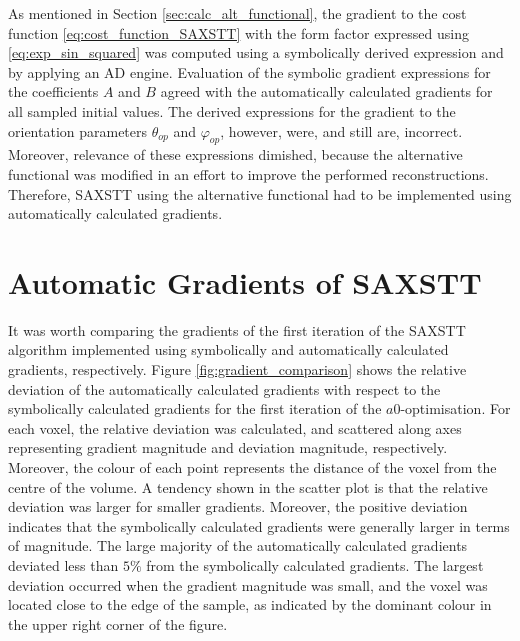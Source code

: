 
As mentioned in Section \ref{sec:calc_alt_functional},
the gradient to the cost function \eqref{eq:cost_function_SAXSTT} with the form factor expressed using \eqref{eq:exp_sin_squared} was computed using a symbolically derived expression and by applying an AD engine.
Evaluation of the symbolic gradient expressions for the coefficients $A$ and $B$ agreed with the automatically calculated gradients for all sampled initial values.
The derived expressions for the gradient to the orientation parameters $\theta_{op}$ and $\varphi_{op}$, however, were, and still are, incorrect.
Moreover, relevance of these expressions dimished, because the alternative functional was modified in an effort to improve the performed reconstructions.
Therefore, SAXSTT using the alternative functional had to be implemented using automatically calculated gradients.

\section{Automatic Gradients of SAXSTT}

It was worth comparing the gradients of the first iteration of the SAXSTT algorithm implemented using symbolically and automatically calculated gradients, respectively.
Figure \ref{fig:gradient_comparison} shows
the relative deviation of the automatically calculated gradients with respect to the symbolically calculated gradients for the first iteration of the $a0$-optimisation.
For each voxel, the relative deviation was calculated, and scattered along axes representing gradient magnitude and deviation magnitude, respectively.
Moreover, the colour of each point represents the distance of the voxel from the centre of the volume.
A tendency shown in the scatter plot is that the relative deviation was larger for smaller gradients.
Moreover, the positive deviation indicates that the symbolically calculated gradients were generally larger in terms of magnitude.
The large majority of the automatically calculated gradients deviated less than $5\%$ from the symbolically calculated gradients.
The largest deviation occurred when the gradient magnitude was small, and the voxel was located close to the edge of the sample,
as indicated by the dominant colour in the upper right corner of the figure.

